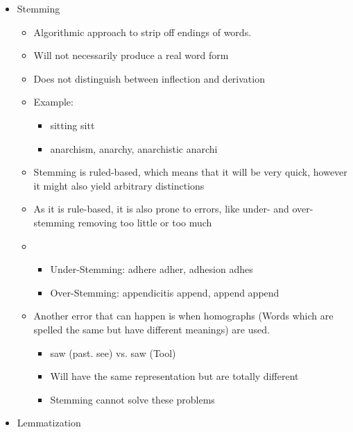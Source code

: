 \documentclass[
../../NLP4W_Summary.tex,
]
{subfiles}
\begin{document}
\begin{greenbox}
    \begin{itemize}
        \item Stemming
        \begin{itemize}
            \item Algorithmic approach to strip off endings of words.
            \item Will not necessarily produce a real word form
            \item Does not distinguish between inflection and derivation
            \item Example: 
            \begin{itemize}
                \item sitting \rightarrow sitt
                \item anarchism, anarchy, anarchistic \rightarrow anarchi
            \end{itemize}
            \item Stemming is ruled-based, which means that it will be very quick, however it might also yield arbitrary distinctions
            \item As it is rule-based, it is also prone to errors, like under- and over-stemming \rightarrow removing too little or too much
            \item \begin{itemize}
                \item Under-Stemming: adhere \rightarrow adher, adhesion \rightarrow adhes
                \item Over-Stemming: appendicitis \rightarrow append, append \rightarrow append
            \end{itemize}
            \item Another error that can happen is when homographs (Words which are spelled the same but have different meanings) are used.
            \begin{itemize}
                \item saw (past. see) vs. saw (Tool)
                \item Will have the same representation but are totally different
                \item Stemming cannot solve these problems
            \end{itemize}
        \end{itemize}
        \item Lemmatization
        \begin{itemize}

\end{itemize}
\end{itemize}
\end{greenbox}
\end{document}
